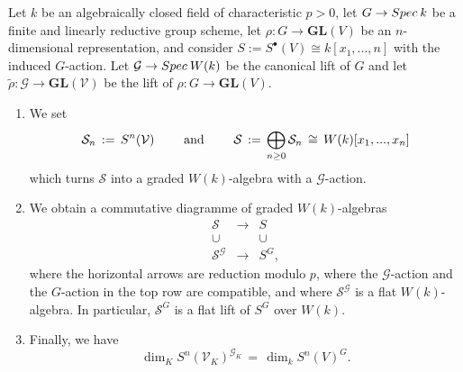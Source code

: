\documentclass[10pt,a4paper]{amsart}
\newcommand{\GL}{{\mathbf{GL}}}
\newcommand{\Spec}{{\rm Spec}\:}
\begin{document}
\begin{Proposition}
\label{prop: lift}
 Let $k$ be an algebraically closed field of characteristic $p>0$,
 let $G\to\Spec k$ be a finite and linearly reductive group scheme, 
 let $\rho:G\to\GL(V)$ be an $n$-dimensional representation, 
 and consider $S:=S^\bullet(V)\cong k[x_1,...,n]$ with the induced $G$-action.
 Let $\mathcal{G}\to\Spec W(k)$ be the canonical lift of $G$
 and let $\widetilde{\rho}:\mathcal{G}\to\GL(\mathcal{V})$ be the 
 lift of $\rho:G\to\GL(V)$.
 \begin{enumerate}
 \item
 We set
 \begin{equation}
 \label{eq: molien lift}
  \mathcal{S}_n\,:=\,S^n(\mathcal{V})\mbox{ \qquad and \qquad } 
  \mathcal{S} \,:=\, \bigoplus_{n\geq0}\mathcal{S}_n\,\cong\, W(k)[x_1,...,x_n]
 \end{equation}
 which turns $\mathcal{S}$ into a graded $W(k)$-algebra with a $\mathcal{G}$-action.
\item We obtain a commutative diagramme of graded $W(k)$-algebras
 $$
 \begin{array}{ccc}
  \mathcal{S} &\to& S\\
  \cup&&\cup\\
   \mathcal{S}^{\mathcal{G}} &\to&S^G,
   \end{array}
 $$
 where the horizontal arrows are reduction modulo $p$, where the 
 $\mathcal{G}$-action and the $G$-action in the top row are compatible,
 and where $\mathcal{S}^{\mathcal{G}}$ is a flat $W(k)$-algebra.
 In particular, $\mathcal{S}^G$ is a flat lift of $S^G$ over $W(k)$.
 \item Finally, we have
 $$
\dim_K S^n(\mathcal{V}_K)^{\mathcal{G}_K} \,=\, \dim_k  S^n(V)^G.
 $$
 \end{enumerate}
 \end{Proposition}
\end{document}
